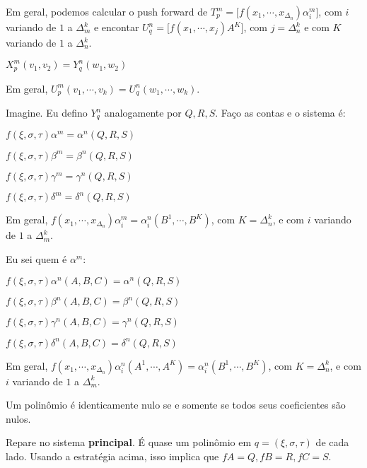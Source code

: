\documentclass[10pt,a4paper]{article}
\begin{document}
		Em geral, podemos calcular o push forward de $T_p^m = \bigg[ f(x_1, \cdots, x_{\Delta_n}) \alpha_i^m \bigg]$, com $i$ variando de $1$ a $\Delta_m^k$ e encontar $U_q^n = \bigg[ f(x_1, \cdots, x_j) A^K \bigg]$, com $j = \Delta_n^k$ e com $K$ variando de $1$ a $\Delta_n^k$.

		\vspace{3mm}

		$X_p^m(v_1, v_2) = Y_q^n(w_1, w_2)$

		Em geral, $U_p^m(v_1, \cdots, v_k) = U_q^n(w_1, \cdots, w_k)$.

		\vspace{3mm}

		Imagine. Eu defino $Y_q^n$ analogamente por $Q,R,S$. Fa\c{c}o as contas e o sistema \'e:

		$f(\xi, \sigma, \tau) \alpha^m = \alpha^n(Q,R,S)$

		$f(\xi, \sigma, \tau) \beta^m = \beta^n(Q,R,S)$

		$f(\xi, \sigma, \tau) \gamma^m = \gamma^n(Q,R,S)$

		$f(\xi, \sigma, \tau) \delta^m = \delta^n(Q,R,S)$

		\vspace{3mm}

		Em geral, $f(x_1, \cdots, x_{\Delta_n}) \alpha_i^m = \alpha_i^n (B^1, \cdots, B^K)$, com $K = \Delta_n^k$, e com $i$ variando de $1$ a $\Delta_m^k$.

		\vspace{3mm}

		Eu sei quem \'e $\alpha^m$:

		$f(\xi, \sigma, \tau) \alpha^n(A,B,C) = \alpha^n(Q,R,S)$

		$f(\xi, \sigma, \tau) \beta^n(A,B,C) = \beta^n(Q,R,S)$

		$f(\xi, \sigma, \tau) \gamma^n(A,B,C) = \gamma^n(Q,R,S)$

		$f(\xi, \sigma, \tau) \delta^n(A,B,C) = \delta^n(Q,R,S)$

		\vspace{3mm}

		Em geral, $f(x_1, \cdots, x_{\Delta_n}) \alpha_i^n(A^1, \cdots, A^K) = \alpha_i^n (B^1, \cdots, B^K)$, com $K = \Delta_n^k$, e com $i$ variando de $1$ a $\Delta_m^k$.

		\vspace{3mm}

		Um polin\^omio \'e identicamente nulo se e somente se todos seus coeficientes s\~ao nulos.

		Repare no sistema \textbf{principal}. \'E quase um polin\^omio em $q = (\xi, \sigma, \tau)$ de cada lado. Usando a estrat\'egia acima, isso implica que $fA = Q, fB = R, fC = S$.
\end{document}
